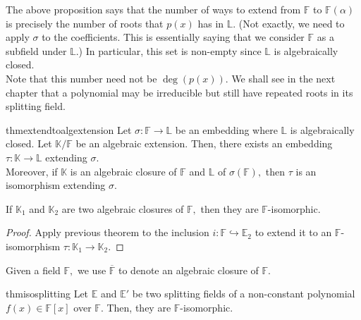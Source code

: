 \begin{rem}
    The above proposition says that the number of ways to extend from $\mathbb{F}$ to $\mathbb{F}(\alpha)$ is precisely the number of roots that $p(x)$ has in $\mathbb{L}.$ (Not exactly, we need to apply $\sigma$ to the coefficients. This is essentially saying that we consider $\mathbb{F}$ as a subfield under $\mathbb{L}.$) In particular, this set is non-empty since $\mathbb{L}$ is algebraically closed. \\
    Note that this number need not be $\deg(p(x)).$ We shall see in the next chapter that a polynomial may be irreducible but still have repeated roots in its splitting field.
\end{rem}

\begin{restatable}[]{thm}{extendtoalgextension}
\label{thm:extendtoalgextension}
    Let $\sigma : \mathbb{F} \to \mathbb{L}$ be an embedding where $\mathbb{L}$ is algebraically closed. Let $\mathbb{K}/\mathbb{F}$ be an algebraic extension. Then, there exists an embedding $\tau : \mathbb{K} \to \mathbb{L}$ extending $\sigma.$ \\
    Moreover, if $\mathbb{K}$ is an algebraic closure of $\mathbb{F}$ and $\mathbb{L}$ of $\sigma(\mathbb{F}),$ then $\tau$ is an isomorphism extending $\sigma.$ \hfill\hyperref[thm:extendtoalgextension2]{\downsym}
\end{restatable}

\begin{cor}
    If $\mathbb{K}_1$ and $\mathbb{K}_2$ are two algebraic closures of $\mathbb{F},$ then they are $\mathbb{F}$-isomorphic.
\end{cor}
\begin{proof} 
    Apply previous theorem to the inclusion $i : \mathbb{F} \hookrightarrow \mathbb{E}_2$ to extend it to an $\mathbb{F}$-isomorphism $\tau : \mathbb{K}_1 \to \mathbb{K}_2.$
\end{proof}

\begin{defn}%
    Given a field $\mathbb{F},$ we use $\overline{\mathbb{F}}$ to denote an algebraic closure of $\mathbb{F}.$ 
\end{defn}

\begin{restatable}{thm}{isosplitting}
\label{thm:isosplitting}
    Let $\mathbb{E}$ and $\mathbb{E}'$ be two splitting fields of a non-constant polynomial $f(x) \in \mathbb{F}[x]$ over $\mathbb{F}.$ Then, they are $\mathbb{F}$-isomorphic. \hfill\hyperref[thm:isosplitting2]{\downsym}
\end{restatable}